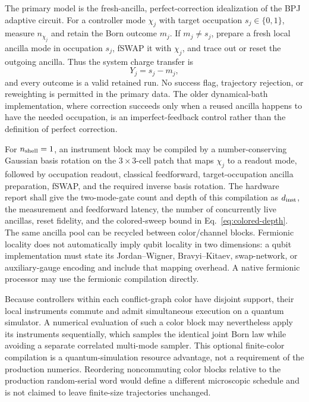 \documentclass[aps,prx,twocolumn,floatfix,nofootinbib,superscriptaddress,longbibliography]{revtex4-2}
\begin{document}
The primary model is the fresh-ancilla, perfect-correction idealization of the BPJ adaptive
circuit.  For a controller mode $\chi_j$ with target occupation $s_j\in\{0,1\}$, measure
$n_{\chi_j}$ and retain the Born outcome $m_j$.  If $m_j\ne s_j$, prepare a fresh local
ancilla mode in occupation $s_j$, fSWAP it with $\chi_j$, and trace out or reset the outgoing
ancilla.  Thus the system charge transfer is
\begin{equation}
 Y_j=s_j-m_j,
\end{equation}
and every outcome is a valid retained run.  No success flag, trajectory rejection, or
reweighting is permitted in the primary data.  The older dynamical-bath implementation,
where correction succeeds only when a reused ancilla happens to have the needed
occupation, is an imperfect-feedback control rather than the definition of perfect
correction.

For $n_{\rm shell}=1$, an instrument block may be compiled by a number-conserving Gaussian
basis rotation on the $3\times3$-cell patch that maps $\chi_j$ to a readout mode, followed
by occupation readout, classical feedforward, target-occupation ancilla preparation,
fSWAP, and the required inverse basis rotation.  The hardware report shall give the
two-mode-gate count and depth of this compilation as $d_{\rm inst}$, the measurement and
feedforward latency, the number of concurrently live ancillas, reset fidelity, and the
colored-sweep bound in Eq.~\eqref{eq:colored-depth}.  The same ancilla pool can be recycled
between color/channel blocks.  Fermionic locality does not automatically imply qubit
locality in two dimensions: a qubit implementation must state its Jordan--Wigner,
Bravyi--Kitaev, swap-network, or auxiliary-gauge encoding and include that mapping
overhead.  A native fermionic processor may use the fermionic compilation directly.

Because controllers within each conflict-graph color have disjoint support, their local
instruments commute and admit simultaneous execution on a quantum simulator.  A numerical
evaluation of such a color block may nevertheless apply its instruments sequentially,
which samples the identical joint Born law while avoiding a separate correlated multi-mode
sampler.  This optional finite-color compilation is a quantum-simulation resource
advantage, not a requirement of the production numerics.  Reordering noncommuting color
blocks relative to the production random-serial word would define a different microscopic
schedule and is not claimed to leave finite-size trajectories unchanged.
\end{document}
